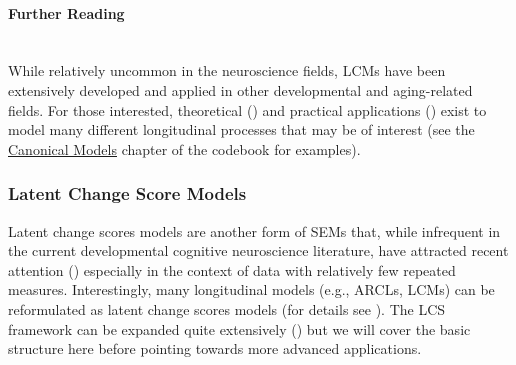\documentclass[11pt]{article}
\newcommand{\subsubsubsection}[1]{\paragraph{#1}\mbox{}\\}  %
\begin{document}
\subsubsubsection{Further Reading}
While relatively uncommon in the neuroscience fields, LCMs have been extensively developed and applied in other developmental and aging-related fields. For those interested, theoretical (\cite{biesanz_role_2004,bollen_latent_2006,hancock_illustration_2001,hancock_vernacular_2006,marcoulides_automated_2018,mcardle_latent_2009,meredith_latent_1990,preacher_meaningful_2015}) and practical applications (\cite{curran_twelve_2010,harden_individual_2011,king_longitudinal_2018,moustafa_longitudinal_2021,parsons_dont_2022}) exist to model many different longitudinal processes that may be of interest (see the \href{https://e-m-mccormick.github.io/static/longitudinal-primer/02-canonical.html#latent-curve-model}{Canonical Models} chapter of the codebook for examples).

\subsubsection{Latent Change Score Models} \label{lcsms}
Latent change scores models are another form of SEMs that, while infrequent in the current developmental cognitive neuroscience literature, have attracted recent attention (\cite{kievit_developmental_2018}) especially in the context of data with relatively few repeated measures. Interestingly, many longitudinal models (e.g., ARCLs, LCMs) can be reformulated as latent change scores models (for details see \cite{serang_correspondence_2019}). The LCS framework can be expanded quite extensively (\cite{grimm_recent_2012,mcardle_latent_2009}) but we will cover the basic structure here before pointing towards more advanced applications.
\end{document}
